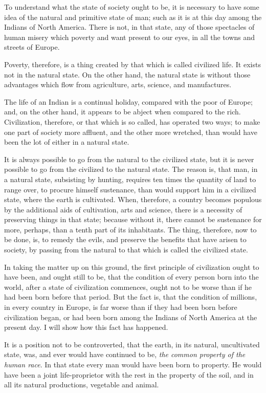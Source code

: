 To understand what the state of society ought to be, it is necessary to have some idea of the natural and primitive state of man; such as it is at this day among the Indians of North America. There is not, in that state, any of those spectacles of human misery which poverty and want present to our eyes, in all the towns and streets of Europe.

Poverty, therefore, is a thing created by that which is called civilized life. It exists not in the natural state. On the other hand, the natural state is without those advantages which flow from agriculture, arts, science, and manufactures.

The life of an Indian is a continual holiday, compared with the poor of Europe; and, on the other hand, it appears to be abject when compared to the rich. Civilization, therefore, or that which is so called, has operated two ways; to make one part of society more affluent, and the other more wretched, than would have been the lot of either in a natural state.

It is always possible to go from the natural to the civilized state, but it is never possible to go from the civilized to the natural state. The reason is, that man, in a natural state, subsisting by hunting, requires ten times the quantity of land to range over, to procure himself sustenance, than would support him in a civilized state, where the earth is cultivated. When, therefore, a country becomes populous by the additional aids of cultivation, arts and science, there is a necessity of preserving things in that state; because without it, there cannot be sustenance for more, perhaps, than a tenth part of its inhabitants. The thing, therefore, now to be done, is, to remedy the evils, and preserve the benefits that have arisen to society, by passing from the natural to that which is called the civilized state.

In taking the matter up on this ground, the first principle of civilization ought to have been, and ought still to be, that the condition of every person born into the world, after a state of civilization commences, ought not to be worse than if he had been born before that period. But the fact is, that the condition of millions, in every country in Europe, is far worse than if they had been born before civilization began, or had been born among the Indians of North America at the present day. I will show how this fact has happened.

It is a position not to be controverted, that the earth, in its natural, uncultivated state, was, and ever would have continued to be, \emph{the common property of the human race}. In that state every man would have been born to property. He would have been a joint life-proprietor with the rest in the property of the soil, and in all its natural productions, vegetable and animal.

